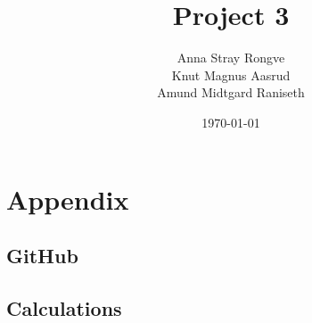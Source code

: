 \documentclass{article}
\title{Project 3}
\author{Anna Stray Rongve \\ Knut Magnus Aasrud \\ Amund Midtgard Raniseth}
\date{\today}
\begin{document}
\maketitle




 








\section{Appendix}
\subsection{GitHub}

\subsection{Calculations}
\end{document}
